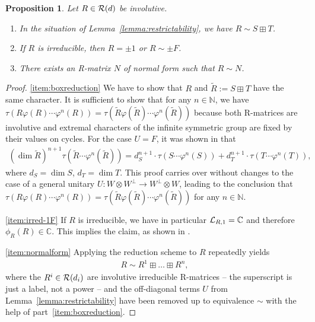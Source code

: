 \documentclass[12pt,a4paper]{amsart}
\numberwithin{equation}{section}
\newtheorem{proposition}[theorem]{Proposition}
\theoremstyle{remark}
\def\dim{\operatorname{dim}}
\newcommand{\ot}{\otimes}
\newcommand{\Cl}{\mathbb{C}}
\def\N{\mathbb{N}}
\begin{document}
\begin{proposition}
    Let $R\in\mathcal{R}(d)$ be involutive.
    \begin{enumerate}
        \item\label{item:boxreduction} In the situation of Lemma~\ref{lemma:restrictability}, we have $R\sim S\boxplus T$.
        \item\label{item:irred-1F} If $R$ is irreducible, then $R=\pm1$ or $R\sim\pm F$.
        \item\label{item:normalform} There exists an R-matrix $N$ of normal form such that $R\sim N$.
    \end{enumerate}
\end{proposition}
\begin{proof}
    \ref{item:boxreduction} We have to show that $R$ and $\tilde R:=S\boxplus T$ have the same character. It is sufficient to show that for any $n\in\N$, we have $\tau(R\varphi(R)\cdots\varphi^n(R))=\tau(\tilde R\varphi(\tilde R)\cdots\varphi^n(\tilde R))$ because both R-matrices are involutive and extremal characters of the infinite symmetric group are fixed by their values on cycles. For the case $U=F$, it was shown in \cite[Prop.~4.4]{LechnerPennigWood:2019} that
    \begin{align*}
    (\dim\tilde R)^{n+1}\tau(\tilde R\cdots\varphi^n(\tilde R))
    =
    d_S^{n+1}\cdot
    \tau(S\cdots\varphi^n(S))
    +
    d_T^{n+1}\cdot
    \tau(T\cdots\varphi^n(T)),
    \end{align*}
    where $d_S=\dim S$, $d_T=\dim T$. This proof carries over without changes to the case of a general unitary $U:W\ot W^\perp\to W^\perp\ot W$, leading to the conclusion that $\tau(R\varphi(R)\cdots\varphi^n(R))=\tau(\tilde R\varphi(\tilde R)\cdots\varphi^n(\tilde R))$ for any $n\in\N$.
    
    \ref{item:irred-1F} If $R$ is irreducible, we have in particular $\CL_{R,1}=\Cl$ and therefore $\phi_R(R)\in\Cl$. This implies the claim, as shown in \cite{LechnerPennigWood:2019}.
    
    \ref{item:normalform} Applying the reduction scheme to $R$ repeatedly yields
    \begin{align*}
        R \sim R^1 \boxplus \ldots \boxplus R^n,
    \end{align*}
    where the $R^i\in\mathcal{R}(d_i)$ are involutive irreducible R-matrices -- the superscript is just a label, not a power -- and the off-diagonal terms $U$ from Lemma~\ref{lemma:restrictability} have been removed up to equivalence $\sim$ with the help of part~\ref{item:boxreduction}. 
    

\end{proof}
\end{document}

